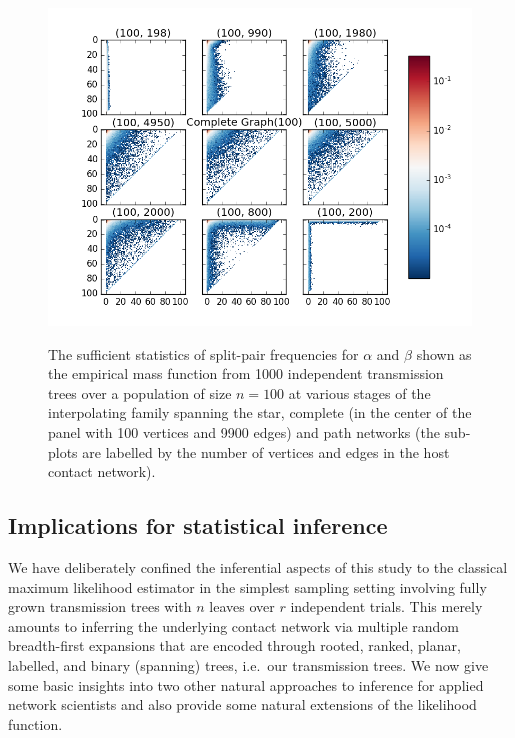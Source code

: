 \documentclass[review]{elsarticle}
\numberwithin{equation}{section}
\begin{document}
\begin{figure}[htbp]
\includegraphics[width=0.95\linewidth]{figures/SuffStatsStar2Complete2Path_n100_r1001.png}\\
\caption{The sufficient statistics of split-pair frequencies for $\alpha$ and $\beta$ shown as the empirical mass function from 1000 independent transmission trees over a population of size $n=100$ at various stages of the interpolating family spanning the star, complete (in the center of the panel with 100 vertices and 9900 edges) and path networks (the sub-plots are labelled by the number of vertices and edges in the host contact network).\label{F:SuffStatsStar2Complete2Path_n100_r1001}}
\end{figure}

\subsection{Implications for statistical inference}\label{S:ImplicationsForStatisticalInference}

We have deliberately confined the inferential aspects of this study to the classical maximum likelihood estimator in the simplest sampling setting involving fully grown transmission trees with $n$ leaves over $r$ independent trials.  
This merely amounts to inferring the underlying contact network via multiple random breadth-first expansions that are encoded through rooted, ranked, planar, labelled, and binary (spanning) trees, i.e.~our transmission trees.  
We now give some basic insights into two other natural approaches to inference for applied network scientists and also provide some natural extensions of the likelihood function.
\end{document}
